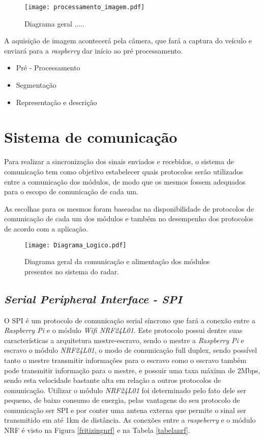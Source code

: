 \begin{figure}[H]
    \centering
    \texttt{[image: processamento\_imagem.pdf]}
    \caption{Diagrama geral .....}
    \label{processamento}
\end{figure}

   A aquisição de imagem acontecerá pela câmera, que fará a captura do veículo e enviará para a \emph{raspberry} dar início ao pré processamento.  
   
\begin{itemize}
    \item Pré - Processamento
    \item Segmentação
    \item Representação e descrição
\end{itemize}



\section{Sistema de comunicação}
Para realizar a sincronização dos sinais enviados e recebidos, o sistema de comunicação tem como objetivo estabelecer quais protocolos serão utilizados entre a comunicação dos módulos, de modo que os mesmos fossem adequados para o escopo de comunicação de cada um.

As escolhas para os mesmos foram baseadas na disponibilidade de protocolos de comunicação de cada um dos módulos e também no desempenho dos protocolos de acordo com a aplicação.


\begin{figure}[H]
    \centering
    \texttt{[image: Diagrama\_Logico.pdf]}
    \caption{Diagrama geral da comunicação e alimentação dos módulos presentes no sistema do radar. }
    \label{diagrama_logico}
\end{figure}



\subsection{\emph{Serial Peripheral Interface - SPI}}
    O SPI é um protocolo de comunicação serial síncrono que fará a conexão entre a \emph{Raspberry Pi} e o módulo \emph{Wifi NRF24L01}. Este protocolo possui dentre suas características a arquitetura mestre-escravo, sendo o mestre a \emph{Raspberry Pi} e escravo o módulo \emph{NRF24L01}, o modo de comunicação full duplex, sendo possível tanto o mestre transmitir informações para o escravo como o escravo também pode transmitir informação para o mestre, e possuir uma taxa máxima de 2Mbps, sendo esta velocidade bastante alta em relação a outros protocolos de comunicação.
    Utilizar o módulo \emph{NRF24L01} foi determinado pelo fato dele ser pequeno, de baixo consumo de energia, pelas vantagens do seu protocolo de comunicação ser SPI e por conter uma antena externa que permite o sinal ser transmitido em até 1km de distância.
    As conexões entre a \emph{raspeberry} e o módulo NRF é visto na Figura \ref{fritizingnrf} e na Tabela \ref{tabelanrf}.
    
